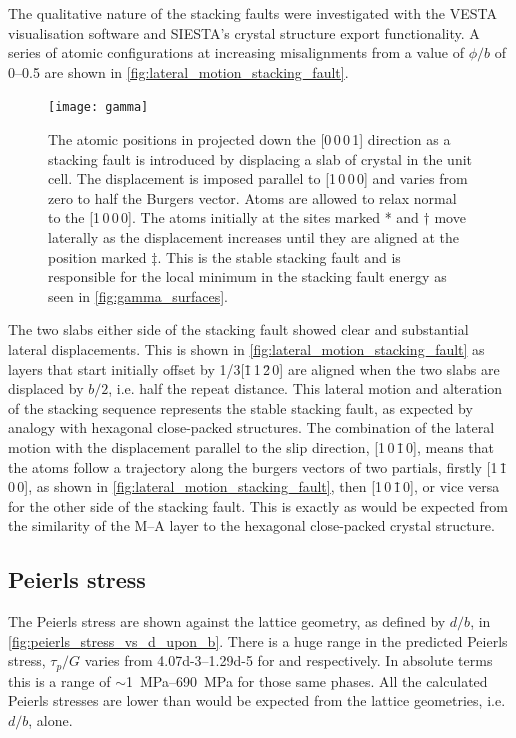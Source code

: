 The qualitative nature of the stacking faults were investigated with the VESTA visualisation software and SIESTA's crystal structure export functionality. A series of atomic configurations at increasing misalignments from a value of $\phi/b$ of \numrange{0}{0.5} are shown in \autoref{fig:lateral_motion_stacking_fault}.


\begin{figure}[!ht]
\centering
\texttt{[image: gamma]}
\captionsetup{width=0.9\textwidth}
\caption[Atomic configurations around stacking faults.]{The atomic positions in  projected down the [0\,0\,0\,1] direction as a stacking fault is introduced by displacing a slab of crystal in the unit cell. The displacement is imposed  parallel to [1\,0\,0\,0] and varies from zero to half the Burgers vector. Atoms are allowed to relax normal to the [1\,0\,0\,0]. The atoms initially at the sites marked * and $\dagger$ move laterally as the displacement increases until they are aligned at the position marked $\ddagger$. This is the stable stacking fault and is responsible for the local minimum in the stacking fault energy as seen in \autoref{fig:gamma_surfaces}. \label{fig:lateral_motion_stacking_fault}}
\end{figure}




The two slabs either side of the stacking fault showed clear and substantial lateral displacements. This is shown in \autoref{fig:lateral_motion_stacking_fault} as layers that start initially offset by 1/3[\={1}\,1\,\=2\,0] are aligned when the two slabs are displaced by $b/2$, i.e. half the repeat distance. This lateral motion and alteration of the stacking sequence represents the stable stacking fault, as expected by analogy with hexagonal close-packed structures. The combination of the lateral motion with the displacement parallel to the slip direction, [1\,0\,\={1}\,0], means that the atoms follow a trajectory along the burgers vectors of two partials, 
 firstly [1\,\={1}\,0\,0], as shown in \autoref{fig:lateral_motion_stacking_fault}, then [1\,0\,\={1}\,0], or vice versa for the other side of the stacking fault. This is exactly as would be expected from the similarity of the M--A layer to the hexagonal close-packed crystal structure. 


\subsection{Peierls stress}

The Peierls stress are shown against the lattice geometry, as defined by $d/b$, in \autoref{fig:peierls_stress_vs_d_upon_b}. There is a huge range in the predicted Peierls stress, $\tau_p / G$ varies from \numrange{4.07d-3}{1.29d-5} for  and  respectively. In absolute terms this is a range of $\sim$\SIrange{1}{690}{\mega\pascal} for those same phases. All the calculated Peierls stresses are lower than would be expected from the lattice geometries, i.e. $d/b$, alone.



